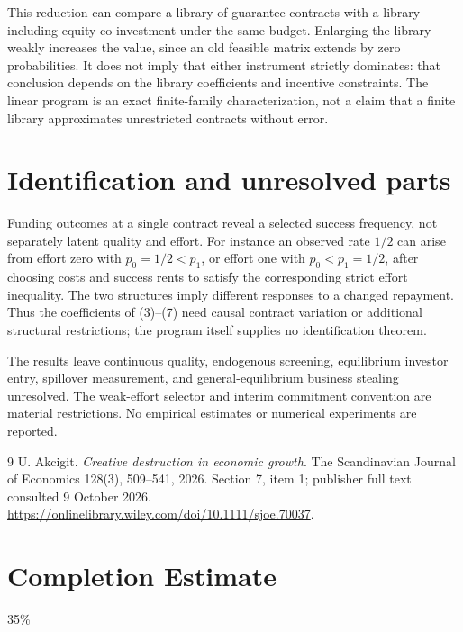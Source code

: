 \documentclass[11pt]{article}
\theoremstyle{remark}
\begin{document}
This reduction can compare a library of guarantee contracts with a library
including equity co-investment under the same budget. Enlarging the library
weakly increases the value, since an old feasible matrix extends by zero
probabilities. It does not imply that either instrument strictly dominates:
that conclusion depends on the library coefficients and incentive constraints.
The linear program is an exact finite-family characterization, not a claim
that a finite library approximates unrestricted contracts without error.

\section{Identification and unresolved parts}
Funding outcomes at a single contract reveal a selected success frequency,
not separately latent quality and effort. For instance an observed rate
$1/2$ can arise from effort zero with $p_0=1/2<p_1$, or effort one with
$p_0< p_1=1/2$, after choosing costs and success rents to satisfy the
corresponding strict effort inequality. The two structures imply different
responses to a changed repayment. Thus the coefficients of (3)--(7) need
causal contract variation or additional structural restrictions; the
program itself supplies no identification theorem.

The results leave continuous quality, endogenous screening, equilibrium
investor entry, spillover measurement, and general-equilibrium business
stealing unresolved. The weak-effort selector and interim commitment
convention are material restrictions. No empirical estimates or numerical
experiments are reported.

\begin{thebibliography}{9}
 U. Akcigit. \emph{Creative destruction in economic growth}.
The Scandinavian Journal of Economics 128(3), 509--541, 2026.
Section 7, item 1; publisher full text consulted 9 October 2026.
\url{https://onlinelibrary.wiley.com/doi/10.1111/sjoe.70037}.
\end{thebibliography}

\section{Completion Estimate}
35\%
\end{document}

